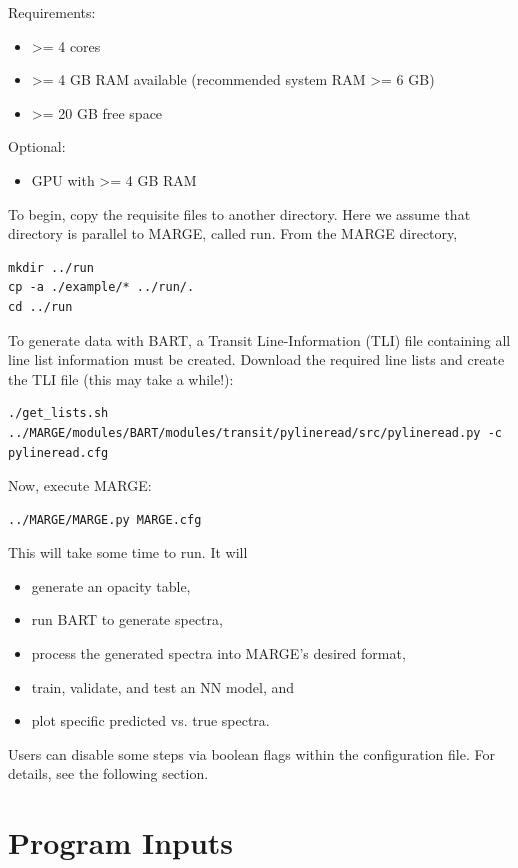 \documentclass[letterpaper, 12pt]{article}
\begin{document}
\noindent Requirements:
\begin{itemize}
\item \textgreater= 4 cores
\item \textgreater= 4 GB RAM available (recommended system RAM \textgreater= 6 GB)
\item \textgreater= 20 GB free space
\end{itemize}

\noindent Optional:
\begin{itemize}
\item GPU with \textgreater= 4 GB RAM
\end{itemize}

\noindent To begin, copy the requisite files to another directory.  Here we 
assume that directory is parallel to MARGE, called run.  From the MARGE 
directory,
\begin{verbatim}
mkdir ../run
cp -a ./example/* ../run/.
cd ../run
\end{verbatim}

\noindent To generate data with BART, a Transit Line-Information (TLI) file 
containing all line list information must be created.  Download the required 
line lists and create the TLI file (this may take a while!):
\begin{verbatim}
./get_lists.sh
../MARGE/modules/BART/modules/transit/pylineread/src/pylineread.py -c pylineread.cfg
\end{verbatim}

\noindent Now, execute MARGE:
\begin{verbatim}
../MARGE/MARGE.py MARGE.cfg
\end{verbatim}

\noindent This will take some time to run.  It will 

\begin{itemize}
\item generate an opacity table,
\item run BART to generate spectra,
\item process the generated spectra into MARGE's desired format,
\item train, validate, and test an NN model, and
\item plot specific predicted vs. true spectra.
\end{itemize}

\noindent Users can disable some steps via boolean flags within the configuration file.  
For details, see the following section.


\section{Program Inputs}
\label{sec:inputs}
\end{document}
